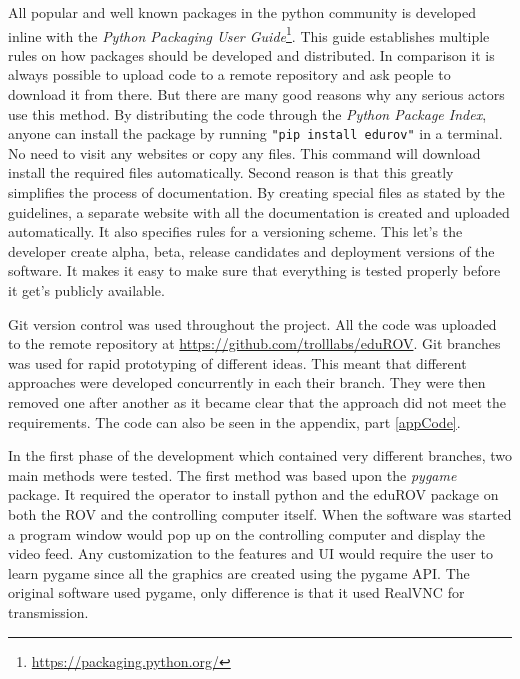 All popular and well known packages in the python community is developed inline with the \emph{Python Packaging User Guide}\footnote{\url{https://packaging.python.org/}}. This guide establishes multiple rules on how packages should be developed and distributed. In comparison it is always possible to upload code to a remote repository and ask people to download it from there. But there are many good reasons why any serious actors use this method. By distributing the code through the \emph{Python Package Index}, anyone can install the package by running \texttt{"pip install edurov"} in a terminal. No need to visit any websites or copy any files. This command will download install the required files automatically. Second reason is that this greatly simplifies the process of documentation. By creating special files as stated by the guidelines, a separate website with all the documentation is created and uploaded automatically. It also specifies rules for a versioning scheme. This let's the developer create alpha, beta, release candidates and deployment versions of the software. It makes it easy to make sure that everything is tested properly before it get's publicly available.

Git version control was used throughout the project. All the code was uploaded to the remote repository at \url{https://github.com/trolllabs/eduROV}. Git branches was used for rapid prototyping of different ideas. This meant that different approaches were developed concurrently in each their branch. They were then removed one after another as it became clear that the approach did not meet the requirements. The code can also be seen in the appendix, part \ref{appCode}.

In the first phase of the development which contained very different branches, two main methods were tested. The first method was based upon the \emph{pygame} package. It required the operator to install python and the eduROV package on both the ROV and the controlling computer itself. When the software was started a program window would pop up on the controlling computer and display the video feed. Any customization to the features and UI would require the user to learn pygame since all the graphics are created using the pygame API. The original software used pygame, only difference is that it used RealVNC for transmission.

